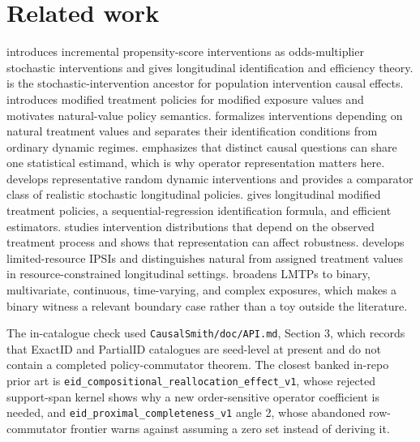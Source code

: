 \documentclass[11pt]{article}
\theoremstyle{definition}
\theoremstyle{plain}
\theoremstyle{remark}
\begin{document}
\section{Related work}
\citet{Kennedy2019JASA} introduces incremental propensity-score interventions as odds-multiplier stochastic interventions and gives longitudinal identification and efficiency theory. \citet{DiazVanDerLaan2012Biometrics} is the stochastic-intervention ancestor for population intervention causal effects. \citet{HaneuseRotnitzky2013StatMed} introduces modified treatment policies for modified exposure values and motivates natural-value policy semantics. \citet{YoungHernanRobins2014EM} formalizes interventions depending on natural treatment values and separates their identification conditions from ordinary dynamic regimes. \citet{VanDerLaanLuedtkeDiaz2014EM} emphasizes that distinct causal questions can share one statistical estimand, which is why operator representation matters here. \citet{YoungLoganRobinsHernan2019JASA} develops representative random dynamic interventions and provides a comparator class of realistic stochastic longitudinal policies. \citet{DiazWilliamsHoffmanSchenck2023JASA} gives longitudinal modified treatment policies, a sequential-regression identification formula, and efficient estimators. \citet{WenMarcusYoung2023SMMR} studies intervention distributions that depend on the observed treatment process and shows that representation can affect robustness. \citet{SarvetWanisYoungHernandezAlejandroStensrud2023Biometrics} develops limited-resource IPSIs and distinguishes natural from assigned treatment values in resource-constrained longitudinal settings. \citet{HoffmanSalazarBarretoWilliamsRudolphDiaz2024Epidemiology} broadens LMTPs to binary, multivariate, continuous, time-varying, and complex exposures, which makes a binary witness a relevant boundary case rather than a toy outside the literature.

The in-catalogue check used \texttt{CausalSmith/doc/API.md}, Section 3, which records that ExactID and PartialID catalogues are seed-level at present and do not contain a completed policy-commutator theorem. The closest banked in-repo prior art is \texttt{eid\_compositional\_reallocation\_effect\_v1}, whose rejected support-span kernel shows why a new order-sensitive operator coefficient is needed, and \texttt{eid\_proximal\_completeness\_v1} angle 2, whose abandoned row-commutator frontier warns against assuming a zero set instead of deriving it.
\end{document}
